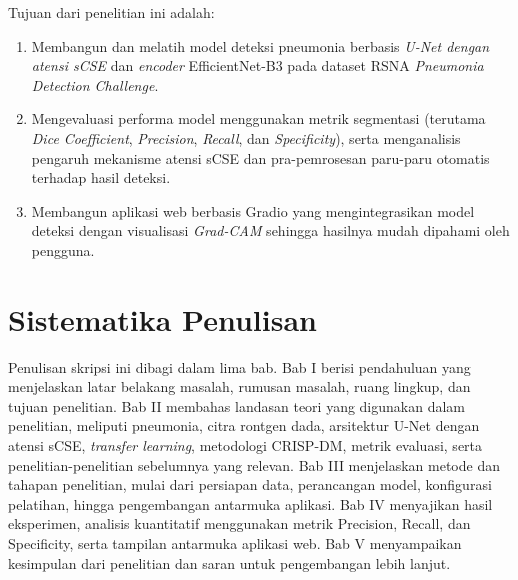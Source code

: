 \documentclass[12pt,a4paper,oneside]{book}
\begin{document}
Tujuan dari penelitian ini adalah:

\begin{enumerate}
  \item Membangun dan melatih model deteksi pneumonia berbasis \textit{U-Net dengan atensi sCSE} dan \textit{encoder} EfficientNet-B3 pada dataset RSNA \textit{Pneumonia Detection Challenge}.
  \item Mengevaluasi performa model menggunakan metrik segmentasi (terutama \textit{Dice Coefficient}, \textit{Precision}, \textit{Recall}, dan \textit{Specificity}), serta menganalisis pengaruh mekanisme atensi sCSE dan pra-pemrosesan paru-paru otomatis terhadap hasil deteksi.
  \item Membangun aplikasi web berbasis Gradio yang mengintegrasikan model deteksi dengan visualisasi \textit{Grad-CAM} sehingga hasilnya mudah dipahami oleh pengguna.
\end{enumerate}

\section{Sistematika Penulisan}

Penulisan skripsi ini dibagi dalam lima bab. Bab I berisi pendahuluan yang menjelaskan latar belakang masalah, rumusan masalah, ruang lingkup, dan tujuan penelitian. Bab II membahas landasan teori yang digunakan dalam penelitian, meliputi pneumonia, citra rontgen dada, arsitektur U-Net dengan atensi sCSE, \textit{transfer learning}, metodologi CRISP-DM, metrik evaluasi, serta penelitian-penelitian sebelumnya yang relevan. Bab III menjelaskan metode dan tahapan penelitian, mulai dari persiapan data, perancangan model, konfigurasi pelatihan, hingga pengembangan antarmuka aplikasi. Bab IV menyajikan hasil eksperimen, analisis kuantitatif menggunakan metrik Precision, Recall, dan Specificity, serta tampilan antarmuka aplikasi web. Bab V menyampaikan kesimpulan dari penelitian dan saran untuk pengembangan lebih lanjut.

\end{document}
